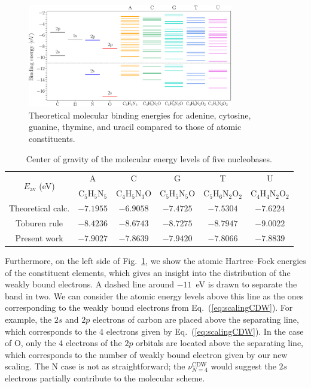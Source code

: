 \documentclass[preprint,showpacs]{revtex4}
\begin{document}
\begin{figure}[t!]
\centering
\includegraphics[width=0.8\textwidth]{figuras/levelsDNA.eps}
\caption{Theoretical molecular binding energies for adenine, cytosine, 
guanine, thymine, and uracil compared to those of atomic constituents.}
\label{fig:bindener}
\end{figure}

\begin{table}[H]
\begin{center}
\begin{tabular}{|c|ccccc|}
\hline
 \multirow{2}{*}{$E_{\text{av}}$ (eV)} & A & C & G & T & U \\
 & C$_5$H$_5$N$_5$ & C$_4$H$_5$N$_3$O & 
   C$_5$H$_5$N$_5$O & C$_5$H$_6$N$_2$O$_2$ & C$_4$H$_4$N$_2$O$_2$ \\
\hline
 Theoretical calc. & $-7.1955$ & $-6.9058$ & $-7.4725$ & $-7.5304$ & $-7.6224$ \\
 Toburen rule  & $-8.4236$ & $-8.6743$ & $-8.7275$ & $-8.7947$ & $-9.0022$ \\
 Present work & $-7.9027$ & $-7.8639$ & $-7.9420$ & $-7.8066$ & $-7.8839$ \\
\hline
\end{tabular}
\caption{Center of gravity of the molecular energy levels of five 
nucleobases.}
\label{tab:gravener}
\end{center}
\end{table}


Furthermore, on the left side of Fig.~\ref{fig:bindener}, we show 
the atomic Hartree--Fock energies of the constituent elements, which 
gives an insight into the distribution of the weakly bound electrons. 
A dashed line around $-11$~eV is drawn to separate the band in two. 
We can consider the atomic energy levels above this line as the ones
corresponding to the weakly bound electrons from Eq.~(\ref{eq:scalingCDW}).
For example, the $2s$ and $2p$ electrons of carbon are placed above
the separating line, which corresponds to the 4 electrons given by 
Eq.~(\ref{eq:scalingCDW}). In the case of O, only the 4 electrons of 
the $2p$ orbitals are located above the separating line, which 
corresponds to the number of weakly bound electron given by 
our new scaling. 
The N case is not as straightforward; the $\nu_{N=4}^{\text{CDW}}$ 
would suggest the $2s$ electrons partially contribute to the molecular 
scheme.
\end{document}
